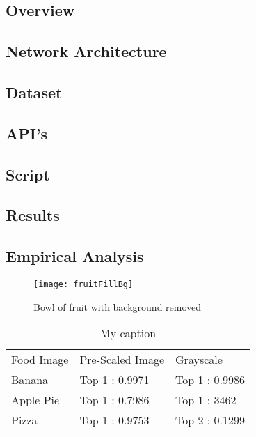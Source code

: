 \subsection*{Overview}
\subsection*{Network Architecture}
\subsection*{Dataset}
\subsection*{API's}
\subsection*{Script}
\subsection*{Results}
\subsection*{Empirical Analysis}

\begin{figure}
    \texttt{[image: fruitFillBg]}
    \caption{Bowl of fruit with background removed}
    \label{fig:filledFruit}
\end{figure}

\begin{table}[]
\centering
\caption{My caption}
\label{my-label}
\begin{tabular}{lll}
Food Image & Pre-Scaled Image & Grayscale      \\
Banana     & Top 1 : 0.9971   & Top 1 : 0.9986 \\
Apple Pie  & Top 1 : 0.7986   & Top 1 : 3462   \\
Pizza      & Top 1 : 0.9753   & Top 2 : 0.1299
\end{tabular}
\end{table}

